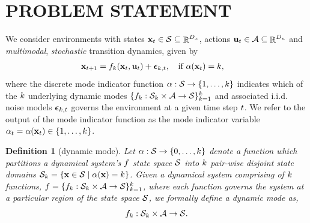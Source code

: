 \documentclass[twoside]{article}
\newtheorem{definition}{Definition}[section]
\DeclareMathOperator{\R}{\mathbb{R}}
\newcommand{\modeInd}{\ensuremath{k}}
\newcommand{\StateDim}{\ensuremath{{D_x}}}
\newcommand{\ControlDim}{\ensuremath{{D_u}}}
\newcommand{\ModeInd}{\ensuremath{\MakeUppercase{\modeInd}}}
\newcommand{\mode}[1]{\ensuremath{#1_{\modeInd}}}
\newcommand{\state}{\ensuremath{\mathbf{x}}}
\newcommand{\control}{\ensuremath{\mathbf{u}}}
\newcommand{\modeVar}{\ensuremath{\alpha}}
\newcommand{\latentFunc}{\ensuremath{f}}
\begin{document}
\section{PROBLEM STATEMENT \label{problem-statement}}
\label{sec:orgd4a100e}
We consider environments with
states \(\state_t \in \stateDomain \subseteq \R^{\StateDim}\), actions \(\control_t \in \controlDomain \subseteq \R^{\ControlDim}\)
and \emph{multimodal}, \emph{stochastic}  transition dynamics, given by
\begin{equation}  \label{eq-dynamics}
\begin{aligned}
\state_{\timeInd+1}
 &= \mode{\dynamicsFunc}(\state_\timeInd, \control_\timeInd) + \bm\epsilon_{\modeInd, \timeInd},
\quad\text{if } \modeVar(\state_{\timeInd}) = \modeInd,
\end{aligned}
\end{equation}
where the discrete mode indicator function \(\modeVar : \stateDomain \rightarrow \{1, \dots, \ModeInd\}\)
indicates which of the \(\ModeInd\) underlying dynamic modes
\(\{\mode{\latentFunc} : \mode{\stateDomain} \times \controlDomain \rightarrow \stateDomain \}_{\modeInd=1}^\ModeInd\)
and associated i.i.d. noise models \(\bm\epsilon_{\modeInd, \timeInd}\)
governs the environment at a given time step \(t\).
We refer to the output of the mode indicator function as the mode indicator variable
\(\alpha_{\timeInd} = \alpha(\state_{\timeInd}) \in \{1,\ldots,\ModeInd\}\).

\begin{definition}[dynamic mode] \label{def-dynamics-mode}
Let $\modeVar : \stateDomain \rightarrow \{0,\ldots, \ModeInd\}$ denote a function which partitions a dynamical system's $f$ state space $\mathcal{S}$ into
$\ModeInd$ pair-wise disjoint state domains
$\mode{\stateDomain} = \{ \state \in \stateDomain \mid \modeVar(\state) = \modeInd \}$.
Given a dynamical system comprising of $\ModeInd$ functions,
$\dynamicsFunc = \{\dynamicsFunc_{\modeInd} : \stateDomain_{\modeInd} \times \controlDomain \rightarrow \stateDomain\}_{\modeInd=1}^{\ModeInd}$,
where each function governs the system at a particular region of the state space $\mathcal{S}$,
we formally define a dynamic mode as,
\begin{align} \label{eq-dynamics-mode-def}
\dynamicsFunc_{\modeInd} : \stateDomain_{\modeInd} \times \controlDomain \rightarrow \stateDomain.
\end{align}
\end{definition}
\end{document}

